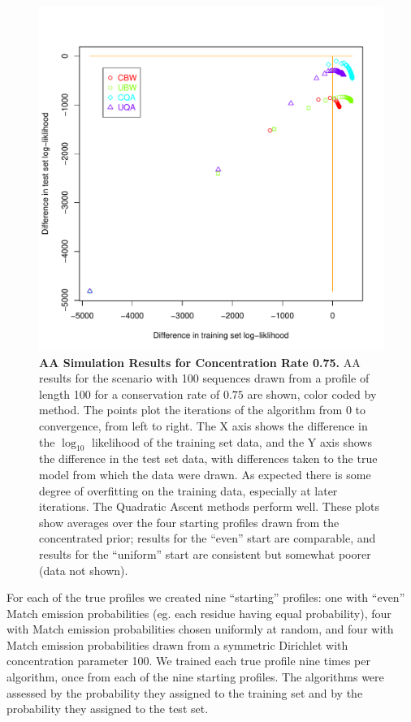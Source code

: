 \documentclass[preprint,12pt,authoryear]{elsarticle}
\begin{document}
\begin{figure}[htp]
\centering
\includegraphics[scale=.85]{AA_priorstart_results_75.pdf}
\caption{\textbf{AA Simulation Results for Concentration Rate 0.75.}  AA results for the scenario with 100 sequences drawn from a profile of length 100 for a conservation rate of $0.75$ are shown, color coded by method.  The points plot the iterations of the algorithm from 0 to convergence, from left to right.  The X axis shows the difference in the $\log_{10}$ likelihood of the training set data, and the Y axis shows the difference in the test set data, with differences taken to the true model from which the data were drawn.  As expected there is some degree of overfitting on the training data, especially at later iterations. The Quadratic Ascent methods perform well.  These plots show averages over the four starting profiles drawn from the concentrated prior; results for the ``even'' start are comparable, and results for the ``uniform'' start are consistent but somewhat poorer (data not shown).}
\label{fig:AA_priorstart_results_75}
\end{figure}


For each of the true
profiles we created nine ``starting'' profiles: one with ``even''
Match emission probabilities (eg. each residue having equal
probability), four with Match emission probabilities chosen uniformly
at random, and four with Match emission probabilities drawn from a
symmetric Dirichlet with concentration parameter 100.  We trained each
true profile nine times per algorithm, once from each of the nine
starting profiles.  The algorithms were assessed by the probability
they assigned to the training set and by the probability they assigned
to the test set.
\end{document}
